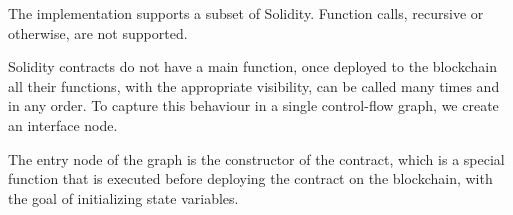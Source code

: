 The implementation supports a subset of Solidity. Function calls, recursive or otherwise, are not supported.

Solidity contracts do not have a main function, once deployed to the blockchain all their functions, with the appropriate visibility, can be called many times and in any order. To capture this behaviour in a single control-flow graph, we create an interface node.

The entry node of the graph is the constructor of the contract, which is a special function that is executed before deploying the contract on the blockchain, with the goal of initializing state variables.


